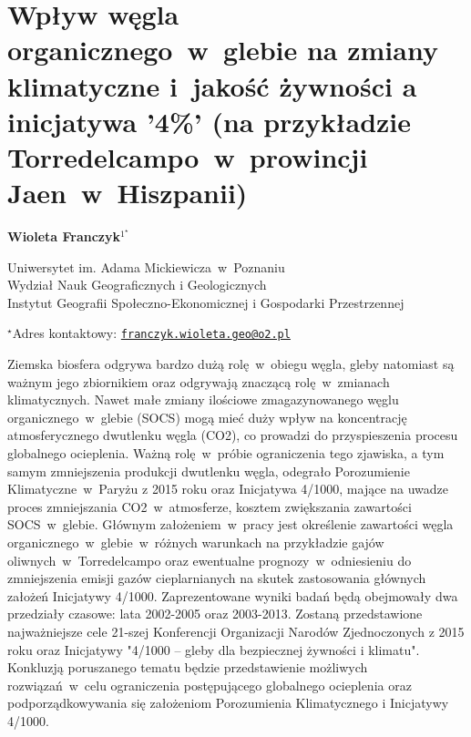 \documentclass[\main/boa.tex]{subfiles}
\begin{document}
\sloppy

\section{Wpływ węgla organicznego~w~glebie na zmiany klimatyczne i~jakość żywności a inicjatywa '4\%' (na przykładzie Torredelcampo~w~prowincji Jaen~w~Hiszpanii)}

\begin{center}
  {\bf {} Wioleta Franczyk$^{1^\star}$}
\end{center}

\vskip 0.3cm

\begin{affiliations}
\begin{enumerate}
\begin{minipage}{0.915\textwidth}
\centering
\item Uniwersytet im. Adama Mickiewicza~w~Poznaniu\\ Wydział Nauk Geograficznych i Geologicznych\\ Instytut Geografii Społeczno-Ekonomicznej i Gospodarki Przestrzennej \\[-2pt]
\end{minipage}
\end{enumerate}
$^\star$Adres kontaktowy: \href{mailto:franczyk.wioleta.geo@o2.pl}{\nolinkurl{franczyk.wioleta.geo@o2.pl}}\\
\end{affiliations}

\vskip 0.5cm


\vskip 0.5cm

Ziemska biosfera odgrywa bardzo dużą rolę~w~obiegu węgla, gleby natomiast są ważnym jego zbiornikiem oraz odgrywają znaczącą rolę~w~zmianach klimatycznych. Nawet małe zmiany ilościowe zmagazynowanego węglu organicznego~w~glebie (SOCS) mogą mieć duży wpływ na koncentrację atmosferycznego dwutlenku węgla (CO2), co prowadzi do przyspieszenia procesu globalnego ocieplenia. Ważną rolę~w~próbie ograniczenia tego zjawiska, a tym samym zmniejszenia produkcji dwutlenku węgla, odegrało Porozumienie Klimatyczne~w~Paryżu z 2015 roku oraz Inicjatywa 4/1000, mające na uwadze proces zmniejszania CO2~w~atmosferze, kosztem zwiększania zawartości SOCS~w~glebie. Głównym założeniem~w~pracy jest określenie zawartości węgla organicznego~w~glebie~w~różnych warunkach na przykładzie gajów oliwnych~w~Torredelcampo oraz ewentualne prognozy~w~odniesieniu do zmniejszenia emisji gazów cieplarnianych na skutek zastosowania głównych założeń Inicjatywy 4/1000. Zaprezentowane wyniki badań będą obejmowały dwa przedziały czasowe: lata 2002-2005 oraz 2003-2013. Zostaną przedstawione najważniejsze cele 21-szej Konferencji Organizacji Narodów Zjednoczonych z 2015 roku oraz Inicjatywy "4/1000 – gleby dla bezpiecznej żywności i klimatu". Konkluzją poruszanego tematu będzie przedstawienie możliwych rozwiązań~w~celu ograniczenia postępującego globalnego ocieplenia oraz podporządkowywania się założeniom Porozumienia Klimatycznego i Inicjatywy 4/1000.
\end{document}

